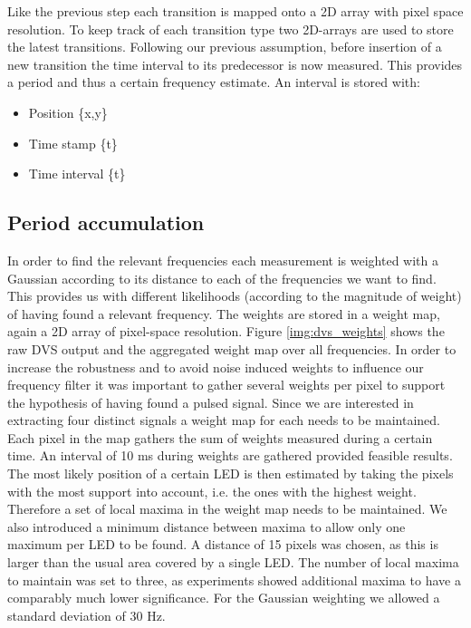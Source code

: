 Like the previous step each transition is mapped onto a 2D array with pixel space resolution. To keep track of each transition type two 2D-arrays are used to store the latest transitions. Following our previous assumption, before insertion of a new transition the time interval to its predecessor is now measured. This provides a period and thus a certain frequency estimate. An interval is stored with:

\begin{itemize}
	\item Position \{x,y\}
	\item Time stamp \{t\}
	\item Time interval \{\delta t\}
\end{itemize}

\subsection{Period accumulation}\label{sec:frequencyaccumulation}

In order to find the relevant frequencies each measurement is weighted with a Gaussian according to its distance to each of the frequencies we want to find. 
This provides us with different likelihoods (according to the magnitude of weight) of having found a relevant frequency. The weights are stored in a weight map, again a 2D array of pixel-space resolution. Figure \ref{img:dvs_weights} shows the raw DVS output and the aggregated weight map over all frequencies. In order to increase the robustness and to avoid noise induced weights to influence our frequency filter it was important to gather several weights per pixel to support the hypothesis of having found a pulsed signal. Since we are interested in extracting four distinct signals a weight map for each needs to be maintained. Each pixel in the map gathers the sum of weights measured during a certain time. An interval of 10 ms during weights are gathered provided feasible results. The most likely position of a certain LED is then estimated by taking the pixels with the most support into account, i.e. the ones with the highest weight.  Therefore a set of local maxima in the weight map needs to be maintained. We also introduced a minimum distance between maxima to allow only one maximum per LED to be found. A distance of 15 pixels was chosen, as this is larger than the usual area covered by a single LED. The number of local maxima to maintain was set to three, as experiments showed additional maxima to have a comparably much lower significance. For the Gaussian weighting we allowed a standard deviation of 30 Hz.

